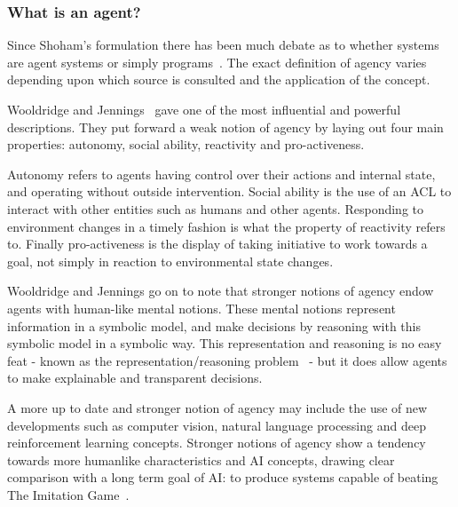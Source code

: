 \documentclass[]{final_report}
\begin{document}
\subsubsection{What is an agent?}
Since Shoham's formulation there has been much debate as to whether systems are agent systems or simply programs~\cite{franklin1996agent}. The exact definition of agency varies depending upon which source is consulted and the application of the concept.\par 
Wooldridge and Jennings~\cite{wooldridge_jennings_1995} gave one of the most influential and powerful descriptions. They put forward a weak notion of agency by laying out four main properties: autonomy, social ability, reactivity and pro-activeness.\par 
Autonomy refers to agents having control over their actions and internal state, and operating without outside intervention. Social ability is the use of an ACL to interact with other entities such as humans and other agents. Responding to environment changes in a timely fashion is what the property of reactivity refers to. Finally pro-activeness is the display of taking initiative to work towards a goal, not simply in reaction to environmental state changes.\par 
Wooldridge and Jennings go on to note that stronger notions of agency endow agents with human-like mental notions. These mental notions represent information in a symbolic model, and make decisions by reasoning with this symbolic model in a symbolic way. This representation and reasoning is no easy feat - known as the representation/reasoning problem~\cite{wooldridge2009introduction} - but it does allow agents to make explainable and transparent decisions.\par 
A more up to date and stronger notion of agency may include the use of new developments such as computer vision, natural language processing and deep reinforcement learning concepts. Stronger notions of agency show a tendency towards more humanlike characteristics and AI concepts, drawing clear comparison with a long term goal of AI: to produce systems capable of beating The Imitation Game~\cite{machinery1950computing}.
\end{document}
